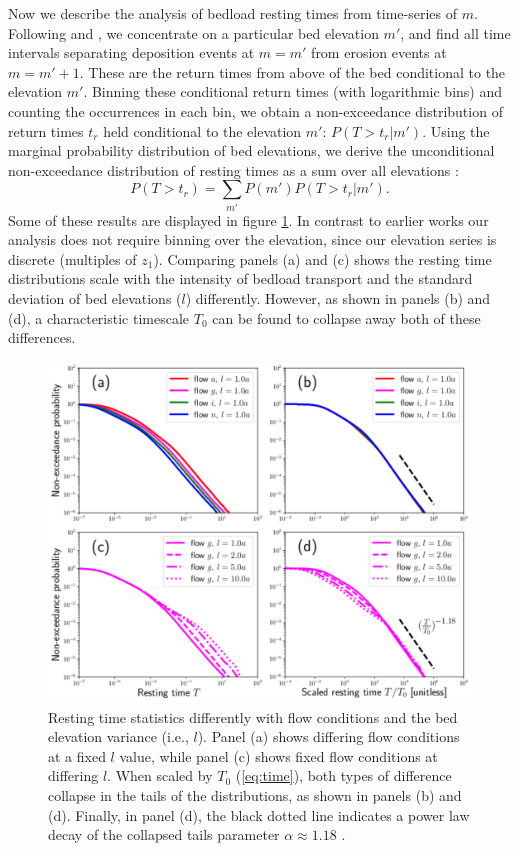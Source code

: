 \documentclass[draft]{agujournal2018}
\newcommand\be{\begin{equation}} %
\newcommand\ee{\end{equation}}   %
\begin{document}
Now we describe the analysis of bedload resting times from time-series of $m$.
Following \citet{Voepel2013} and \citet{Martin2014}, we concentrate on a particular bed elevation $m'$, and find all time intervals separating deposition events at $m=m'$ from erosion events at $m=m'+1$.
These are the return times from above of the bed conditional to the elevation $m'$.
Binning these conditional return times (with logarithmic bins) and counting the occurrences in each bin, we obtain a non-exceedance distribution of return times $t_r$ held conditional to the elevation $m'$: $P(T>t_r|m')$.
Using the marginal probability distribution of bed elevations, we derive the unconditional non-exceedance distribution of resting times as a sum over all elevations \citep{Yang1971, Nakagawa1980, Voepel2013, Martin2014}:
\be P(T>t_r) = \sum_{m'} P(m') P(T>t_r|m') .\ee
Some of these results are displayed in figure \ref{fig:cdfs}.
In contrast to earlier works our analysis does not require binning over the elevation, since our elevation series is discrete (multiples of $z_1$).
Comparing panels (a) and (c) shows the resting time distributions scale with the intensity of bedload transport and the standard deviation of bed elevations ($l$) differently.
However, as shown in panels (b) and (d), a characteristic timescale $T_0$ can be found to collapse away both of these differences.
\begin{figure}[t!]
	\includegraphics[width=\linewidth,keepaspectratio]{./figures/montage1.pdf}
	\caption{Resting time statistics differently with flow conditions and the bed elevation variance (i.e., $l$). Panel (a) shows differing flow conditions at a fixed $l$ value, while panel (c) shows fixed flow conditions at differing $l$. When scaled by $T_0$ (\ref{eq:time}), both types of difference collapse in the tails of the distributions, as shown in panels (b) and (d). Finally, in panel (d), the black dotted line indicates a power law decay of the collapsed tails parameter $\alpha\approx1.18$ .}
	\label{fig:cdfs}
\end{figure}
\end{document}
